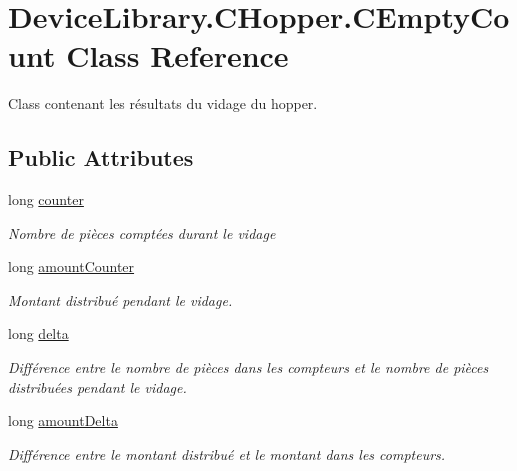 \hypertarget{class_device_library_1_1_c_hopper_1_1_c_empty_count}{}\section{Device\+Library.\+C\+Hopper.\+C\+Empty\+Count Class Reference}
\label{class_device_library_1_1_c_hopper_1_1_c_empty_count}


Class contenant les résultats du vidage du hopper.  


\subsection*{Public Attributes}
\begin{DoxyCompactItemize}
\item 
long \mbox{\hyperlink{class_device_library_1_1_c_hopper_1_1_c_empty_count_a8ccb96ba708ceb8206e3ba99ebb201da}{counter}}
\begin{DoxyCompactList}\small\item\em Nombre de pièces comptées durant le vidage \end{DoxyCompactList}\item 
long \mbox{\hyperlink{class_device_library_1_1_c_hopper_1_1_c_empty_count_aa9438d053793ad17dfaaba410dff2af1}{amount\+Counter}}
\begin{DoxyCompactList}\small\item\em Montant distribué pendant le vidage. \end{DoxyCompactList}\item 
long \mbox{\hyperlink{class_device_library_1_1_c_hopper_1_1_c_empty_count_adf61aa1680a4934d9e2e6ebc47734e5a}{delta}}
\begin{DoxyCompactList}\small\item\em Différence entre le nombre de pièces dans les compteurs et le nombre de pièces distribuées pendant le vidage. \end{DoxyCompactList}\item 
long \mbox{\hyperlink{class_device_library_1_1_c_hopper_1_1_c_empty_count_a30e4ea7873f253cbaa362dac6985043b}{amount\+Delta}}
\begin{DoxyCompactList}\small\item\em Différence entre le montant distribué et le montant dans les compteurs. \end{DoxyCompactList}\end{DoxyCompactItemize}


